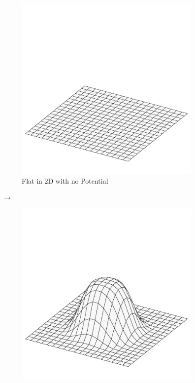 \documentclass[crop=false]{stdlocal}
\begin{document}
  \begin{figure}[H]
    \centering
    \begin{subfigure}[c]{0.4\linewidth}
      \centering
      \includegraphics[width=\linewidth,trim={0mm 0 0 60},clip]{plots/plane.pdf}
      \caption{Flat in 2D with no Potential}
      \label{fig:lifting-flat}
    \end{subfigure}
    \hfill
    $\longrightarrow$
    \hfill
    \begin{subfigure}[c]{0.4\linewidth}
      \centering
      \includegraphics[width=\linewidth,trim={0mm 0 0 60},clip]{plots/gauss.pdf}

\end{subfigure}
\end{figure}
\end{document}

